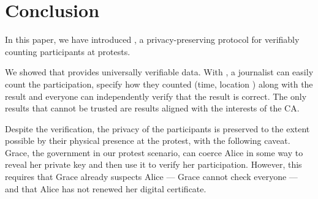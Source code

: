 \section{Conclusion}%
\label{Conclusion}

In this paper, we have introduced \CROCUS, a privacy-preserving protocol for verifiably counting participants at protests. 

We showed that \CROCUS provides universally verifiable data.
With \CROCUS, a journalist can easily count the participation, specify how they 
counted (time, location \etc) along with the result and everyone can 
independently verify that the result is correct.
The only results that cannot be trusted are results aligned with the interests 
of the \ac{CA}.

Despite the verification, the privacy of the participants is preserved to the extent possible by their physical presence at the protest, with the following caveat. Grace, the government in our protest scenario, can coerce Alice in some way to reveal her private key and then use it to verify her participation. However, this requires that Grace already suspects Alice --- Grace cannot check everyone --- and that Alice has not renewed her digital certificate.







